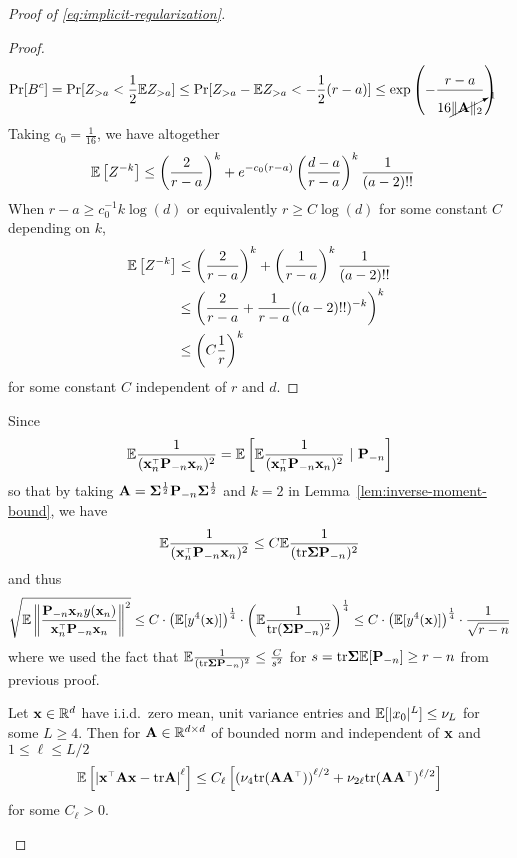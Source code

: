 \documentclass[11pt]{article}
\begin{document}
\begin{proof}[Proof of \eqref{eq:implicit-regularization}]
\begin{proof}
  \begin{align*}
    \mathrm{Pr}[B^c]
    &= \mathrm{Pr}[Z_{> a} < \frac{1}{2} \mathbb E Z_{> a}]
    \leq \mathrm{Pr}[Z_{> a} - \mathbb E Z_{> a} < -\frac{1}{2} (r - a)]
    \leq \exp\left( - \frac{r - a}{16 \cancelto{1}{\|\mathbf A\|_2}} \right)
  \end{align*}
  Taking $c_0 = \frac{1}{16}$, we have altogether
  \begin{align*}
    \mathbb E\left[ Z^{-k} \right]
    &\leq \left(\frac{2}{r - a} \right)^{k}
    + e^{-c_0 (r - a)} \left(\frac{d-a}{r-a}\right)^k \frac{1}{(a - 2)!!}
  \end{align*}
  When $r - a \geq c_0^{-1} k \log(d)$ or
  equivalently $r \geq C \log(d)$ for some constant $C$ depending on $k$,
  \begin{align*}
    \mathbb E\left[ Z^{-k} \right]
    &\leq \left(\frac{2}{r - a} \right)^{k}
    + \left(\frac{1}{r-a}\right)^k \frac{1}{(a - 2)!!} \\
    &\leq \left(
        \frac{2}{r - a} + \frac{1}{r-a} ((a - 2)!!)^{-k}
    \right)^k\\
    &\leq \left(C \frac{1}{r}\right)^k
  \end{align*}
  for some constant $C$ independent of $r$ and $d$.
\end{proof}

Since
\[
  \E \frac1{ (\x_n^\top \P_{-n} \x_n)^2} = \E \left[ \E \frac1{ (\x_n^\top \P_{-n} \x_n)^2}~|~\P_{-n} \right] 
\]
so that by taking $\mathbf A = \mathbf{\Sigma}^{\frac12} \mathbf P_{-n} \mathbf{\Sigma}^{\frac12}$ and $k=2$ in Lemma~\ref{lem:inverse-moment-bound}, we have
\[
  \E \frac1{ (\x_n^\top \P_{-n} \x_n)^2} \le C \E \frac1{ (\tr \Sigmab \P_{-n})^2}
\]
and thus
\[
  \sqrt{\E \left\| \frac{ \P_{-n} \x_n y(\x_n) }{\x_n^\top \P_{-n} \x_n } \right\|^2} \le C \cdot \left( \E[y^4(\x)] \right)^{\frac14} \cdot \left( \E \frac1{ \tr (\Sigmab \P_{-n})^2 } \right)^{\frac14 } \le C \cdot \left( \E[y^4(\x)] \right)^{\frac14} \cdot \frac1{\sqrt{r - n}}
\]
where we used the fact that $\mathbb E \frac1{ (\mathrm{tr} \mathbf{\Sigma} \mathbf P_{-n})^2 } \le \frac{C}{s^2}$ for $s= \mathrm{tr} \mathbf{\Sigma} \mathbb E[\mathbf P_{-n}] \ge r - n$ from previous proof.

\begin{lemma}
    \label{lem:bai-b26}
    Let $\mathbf x \in \mathbb R^d$ have i.i.d.~zero mean, unit variance entries and $\mathbb E[\lvert x_0 \rvert^L] \leq \nu_L$ for some $L \geq 4$. Then for $\mathbf A \in \mathbb R^{d \times d}$ of bounded norm and independent of $\mathbf x$ and $1 \leq \ell \leq L/2$
    \begin{align*}
        \E \left[\left| \x^\top \A \x - \tr \A \right|^\ell\right] \leq C_\ell \left[ \left( \nu_4 \tr(\A \A^\top)\right)^{\ell/2} + \nu_{2\ell} \tr(\A \A^\top)^{\ell/2} \right]
    \end{align*}
    for some $C_\ell > 0$.
\end{lemma}



\end{proof}
\end{document}
